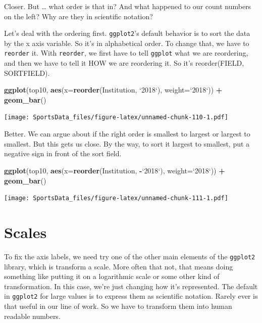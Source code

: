\documentclass[
]{book}
\newenvironment{Shaded}{\begin{snugshade}}{\end{snugshade}}
\newcommand{\DataTypeTok}[1]{\textcolor[rgb]{0.13,0.29,0.53}{#1}}
\newcommand{\KeywordTok}[1]{\textcolor[rgb]{0.13,0.29,0.53}{\textbf{#1}}}
\newcommand{\NormalTok}[1]{#1}
\newcommand{\OperatorTok}[1]{\textcolor[rgb]{0.81,0.36,0.00}{\textbf{#1}}}
\newcommand{\StringTok}[1]{\textcolor[rgb]{0.31,0.60,0.02}{#1}}
\begin{document}
Closer. But \ldots{} what order is that in? And what happened to our count numbers on the left? Why are they in scientific notation?

Let's deal with the ordering first. \texttt{ggplot2}'s default behavior is to sort the data by the x axis variable. So it's in alphabetical order. To change that, we have to \texttt{reorder} it. With \texttt{reorder}, we first have to tell \texttt{ggplot} what we are reordering, and then we have to tell it HOW we are reordering it. So it's reorder(FIELD, SORTFIELD).

\begin{Shaded}
\begin{Highlighting}[]
\KeywordTok{ggplot}\NormalTok{(top10, }\KeywordTok{aes}\NormalTok{(}\DataTypeTok{x=}\KeywordTok{reorder}\NormalTok{(Institution, }\StringTok{`}\DataTypeTok{2018}\StringTok{`}\NormalTok{), }\DataTypeTok{weight=}\StringTok{`}\DataTypeTok{2018}\StringTok{`}\NormalTok{)) }\OperatorTok{+}\StringTok{ }\KeywordTok{geom_bar}\NormalTok{()}
\end{Highlighting}
\end{Shaded}

\texttt{[image: SportsData\_files/figure-latex/unnamed-chunk-110-1.pdf]}

Better. We can argue about if the right order is smallest to largest or largest to smallest. But this gets us close. By the way, to sort it largest to smallest, put a negative sign in front of the sort field.

\begin{Shaded}
\begin{Highlighting}[]
\KeywordTok{ggplot}\NormalTok{(top10, }\KeywordTok{aes}\NormalTok{(}\DataTypeTok{x=}\KeywordTok{reorder}\NormalTok{(Institution, }\OperatorTok{-}\StringTok{`}\DataTypeTok{2018}\StringTok{`}\NormalTok{), }\DataTypeTok{weight=}\StringTok{`}\DataTypeTok{2018}\StringTok{`}\NormalTok{)) }\OperatorTok{+}\StringTok{ }\KeywordTok{geom_bar}\NormalTok{()}
\end{Highlighting}
\end{Shaded}

\texttt{[image: SportsData\_files/figure-latex/unnamed-chunk-111-1.pdf]}

\hypertarget{scales}{%
\section{Scales}\label{scales}}

To fix the axis labels, we need try one of the other main elements of the \texttt{ggplot2} library, which is transform a scale. More often that not, that means doing something like putting it on a logarithmic scale or some other kind of transformation. In this case, we're just changing how it's represented. The default in \texttt{ggplot2} for large values is to express them as scientific notation. Rarely ever is that useful in our line of work. So we have to transform them into human readable numbers.
\end{document}
